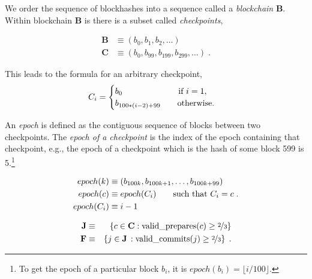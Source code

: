 \documentclass[12pt]{article}
\begin{document}
We order the sequence of blockhashes into a sequence called a \emph{blockchain} $\mathbf{B}$.  Within blockchain $\mathbf{B}$ is there is a subset called \emph{checkpoints},

\begin{equation}
\begin{split}
    \mathbf{B} &\equiv \left( b_0, b_1, b_2, \ldots \right) \\
    \mathbf{C} &\equiv \left( b_0, b_{99}, b_{199}, b_{299}, \ldots \right) \; .
\end{split}
\end{equation}

This leads to the formula for an arbitrary checkpoint,
\begin{equation}
    C_i = \begin{cases}
     b_0 \qquad \qquad \qquad\ \  \textnormal{if } i = 1, \\
     b_{ 100*(i-2) + 99 } \qquad \textnormal{otherwise.}
     \end{cases}
\end{equation}


An \emph{epoch} is defined as the contiguous sequence of blocks between two checkpoints.  The \textit{epoch of a checkpoint} is the index of the epoch containing that checkpoint, e.g., the epoch of a checkpoint which is the hash of some block 599 is 5.\footnote{To get the epoch of a particular block $b_i$, it is $epoch(b_i) = \lfloor i / 100 \rfloor$.}

\begin{equation}
    \begin{split}
    epoch(k) &\equiv \left( b_{100k}, b_{100k + 1}, \ldots, b_{100k + 99} \right) \\
    epoch(c) & \equiv epoch(C_i) \qquad \textnormal{such that } C_i = c \\
    epoch(C_i) & \equiv i - 1 \\    
    \end{split} \; .
\end{equation}

\begin{eqnarray}
    \mathbf{J} &\equiv& \left\{ c \in \mathbf{C} : \textnormal{valid\_prepares}(c) \geq \nicefrac{2}{3} \right\} \\
    \mathbf{F} &\equiv& \left\{ j \in \mathbf{J} \,: \textnormal{valid\_commits}(j) \geq \nicefrac{2}{3} \right\} \; .
\end{eqnarray}


\end{document}
